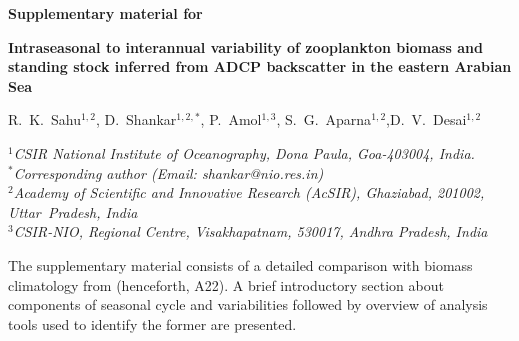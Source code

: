 \documentclass[12pt,a4paper]{article}
\begin{document}
\begin{center}
\textbf{Supplementary material for}

\vspace{5mm}

\textbf{\Large{Intraseasonal to interannual variability of zooplankton biomass and standing stock inferred from ADCP backscatter in the eastern Arabian Sea}}
  
  \vspace{5mm}

  {R.~K.~Sahu$^{1,2}$, D.~Shankar$^{1,2,*}$, P.~Amol$^{1,3}$, S.~G.~Aparna$^{1,2}$,D.~V.~Desai$^{1,2}$}\\
  
  \vspace{5mm}

\textit{$^1$CSIR National Institute of Oceanography, Dona Paula, Goa-403004, India.} \\
    \textit{$^*$Corresponding author (Email: shankar@nio.res.in)} \\
\textit{$^2$Academy of Scientific and Innovative Research (AcSIR), 
	Ghaziabad, 201002, Uttar~Pradesh, India} \\
\textit{$^3$CSIR-NIO, Regional Centre, Visakhapatnam, 530017, Andhra Pradesh, India}
  \vspace{5mm}

\end{center}
\linenumbers
	The supplementary material consists of a detailed comparison with biomass climatology from \citep{aparna2022seasonal} (henceforth, A22). A brief introductory section about components of seasonal cycle and variabilities followed by overview of analysis tools used to identify the former are presented.
\end{document}
